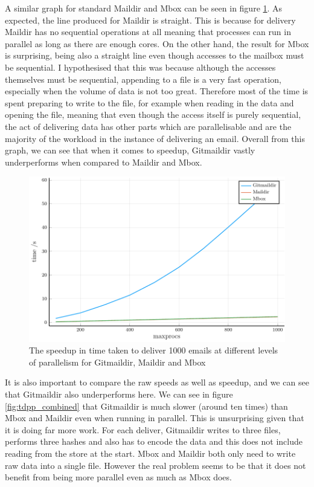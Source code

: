 A similar graph for standard Maildir and Mbox can be seen in figure \ref{fig:tdpp_speedup_combined}. As expected, the line produced for Maildir is straight. This is because for delivery Maildir has no sequential operations at all meaning that processes can run in parallel as long as there are enough cores. On the other hand, the result for Mbox is surprising, being also a straight line even though accesses to the mailbox must be sequential. I hypothesised that this was because although the accesses themselves must be sequential, appending to a file is a very fast operation, especially when the volume of data is not too great. Therefore most of the time is spent preparing to write to the file, for example when reading in the data and opening the file, meaning that even though the access itself is purely sequential, the act of delivering data has other parts which are parallelisable and are the majority of the workload in the instance of delivering an email. Overall from this graph, we can see that when it comes to speedup, Gitmaildir vastly underperforms when compared to Maildir and Mbox.

\begin{figure}[h]
    \centering
    \includegraphics{figs/tdpp_speedup_combined}
    \caption{The speedup in time taken to deliver 1000 emails at different levels of parallelism for Gitmaildir, Maildir and Mbox}
    \label{fig:tdpp_speedup_combined}
\end{figure}

It is also important to compare the raw speeds as well as speedup, and we can see that Gitmaildir also underperforms here. We can see in figure \ref{fig:tdpp_combined} that Gitmaildir is much slower (around ten times) than Mbox and Maildir even when running in parallel. This is unsurprising given that it is doing far more work. For each deliver, Gitmaildir writes to three files, performs three hashes and also has to encode the data and this does not include reading from the store at the start. Mbox and Maildir both only need to write raw data into a single file. However the real problem seems to be that it does not benefit from being more parallel even as much as Mbox does.

